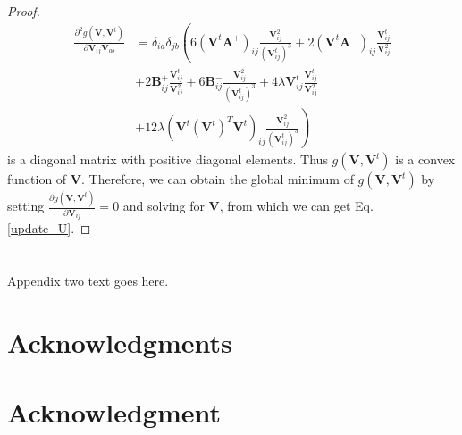 \documentclass[10pt,journal,compsoc]{IEEEtran}
\begin{document}
\begin{proof}
\begin{align}
\frac{\partial^{2} \mathit{g}(\mathbf{V}, \mathbf{V}^t)}{\partial \mathbf{V}_{ij} \mathbf{V}_{ab}} &= \delta_{ia} \delta_{jb} \left( 6(\mathbf{V}^t \mathbf{A}^{+})_{ij} \frac{\mathbf{V}_{ij}^{2}}{(\mathbf{V}_{ij}^{t})^3}  + 2 (\mathbf{V}^t \mathbf{A}^{-})_{ij} \frac{\mathbf{V}_{ij}^{t}} {\mathbf{V}_{ij}^2} \right. \nonumber \\
& + 2 \mathbf{B}_{ij}^{+} \frac{\mathbf{V}_{ij}^{t}} {\mathbf{V}_{ij}^2}  + 6 \mathbf{B}_{ij}^{-} \frac{\mathbf{V}_{ij}^2 }{(\mathbf{V}_{ij}^{t})^{3}}  + 4 \lambda \mathbf{V}_{ij}^t\frac{\mathbf{V}_{ij}^t}{\mathbf{V}_{ij}^2}  \nonumber \\
&+ \left. 12 \lambda \left(\mathbf{V}^{t} (\mathbf{V}^{t})^T\mathbf{V}^{t} \right)_{ij} \frac{\mathbf{V}_{ij}^2 }{(\mathbf{V}_{ij}^{t})^{3}} \right)
\end{align}
is a diagonal matrix with positive diagonal elements. Thus $\mathit{g}(\mathbf{V}, \mathbf{V}^t)$ is a convex function of $\mathbf{V}$. Therefore, we can obtain the global minimum of $\mathit{g}(\mathbf{V}, \mathbf{V}^t)$ by setting $\frac{\partial \mathit{g}(\mathbf{V}, \mathbf{V}^t)}{\partial \mathbf{V}_{ij}} = 0$ and solving for $\mathbf{V}$, from which we can get Eq. \eqref{update_U}.
\end{proof}




\section{}
Appendix two text goes here.


\ifCLASSOPTIONcompsoc
  \section*{Acknowledgments}
\else
  \section*{Acknowledgment}
\fi
\end{document}
